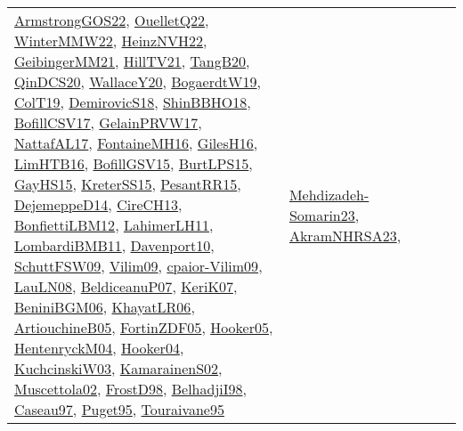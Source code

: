 {\begin{longtable}{llp{6cm}p{6cm}p{6cm}}
\href{papers/ArmstrongGOS22.pdf}{ArmstrongGOS22}\cite{ArmstrongGOS22}, \href{papers/OuelletQ22.pdf}{OuelletQ22}\cite{OuelletQ22}, \href{papers/WinterMMW22.pdf}{WinterMMW22}\cite{WinterMMW22}, \href{articles/HeinzNVH22.pdf}{HeinzNVH22}\cite{HeinzNVH22}, \href{papers/GeibingerMM21.pdf}{GeibingerMM21}\cite{GeibingerMM21}, \href{papers/HillTV21.pdf}{HillTV21}\cite{HillTV21}, \href{papers/TangB20.pdf}{TangB20}\cite{TangB20}, \href{articles/QinDCS20.pdf}{QinDCS20}\cite{QinDCS20}, \href{articles/WallaceY20.pdf}{WallaceY20}\cite{WallaceY20}, \href{papers/BogaerdtW19.pdf}{BogaerdtW19}\cite{BogaerdtW19}, \href{papers/ColT19.pdf}{ColT19}\cite{ColT19}, \href{papers/DemirovicS18.pdf}{DemirovicS18}\cite{DemirovicS18}, \href{articles/ShinBBHO18.pdf}{ShinBBHO18}\cite{ShinBBHO18}, \href{papers/BofillCSV17.pdf}{BofillCSV17}\cite{BofillCSV17}, \href{papers/GelainPRVW17.pdf}{GelainPRVW17}\cite{GelainPRVW17}, \href{articles/NattafAL17.pdf}{NattafAL17}\cite{NattafAL17}, \href{papers/FontaineMH16.pdf}{FontaineMH16}\cite{FontaineMH16}, \href{papers/GilesH16.pdf}{GilesH16}\cite{GilesH16}, \href{papers/LimHTB16.pdf}{LimHTB16}\cite{LimHTB16}, \href{papers/BofillGSV15.pdf}{BofillGSV15}\cite{BofillGSV15}, \href{papers/BurtLPS15.pdf}{BurtLPS15}\cite{BurtLPS15}, \href{papers/GayHS15.pdf}{GayHS15}\cite{GayHS15}, \href{papers/KreterSS15.pdf}{KreterSS15}\cite{KreterSS15}, \href{papers/PesantRR15.pdf}{PesantRR15}\cite{PesantRR15}, \href{papers/DejemeppeD14.pdf}{DejemeppeD14}\cite{DejemeppeD14}, \href{papers/CireCH13.pdf}{CireCH13}\cite{CireCH13}, \href{papers/BonfiettiLBM12.pdf}{BonfiettiLBM12}\cite{BonfiettiLBM12}, \href{papers/LahimerLH11.pdf}{LahimerLH11}\cite{LahimerLH11}, \href{papers/LombardiBMB11.pdf}{LombardiBMB11}\cite{LombardiBMB11}, \href{papers/Davenport10.pdf}{Davenport10}\cite{Davenport10}, \href{papers/SchuttFSW09.pdf}{SchuttFSW09}\cite{SchuttFSW09}, \href{papers/Vilim09.pdf}{Vilim09}\cite{Vilim09}, \href{papers/cpaior-Vilim09.pdf}{cpaior-Vilim09}\cite{cpaior-Vilim09}, \href{papers/LauLN08.pdf}{LauLN08}\cite{LauLN08}, \href{papers/BeldiceanuP07.pdf}{BeldiceanuP07}\cite{BeldiceanuP07}, \href{papers/KeriK07.pdf}{KeriK07}\cite{KeriK07}, \href{papers/BeniniBGM06.pdf}{BeniniBGM06}\cite{BeniniBGM06}, \href{articles/KhayatLR06.pdf}{KhayatLR06}\cite{KhayatLR06}, \href{papers/ArtiouchineB05.pdf}{ArtiouchineB05}\cite{ArtiouchineB05}, \href{papers/FortinZDF05.pdf}{FortinZDF05}\cite{FortinZDF05}, \href{articles/Hooker05.pdf}{Hooker05}\cite{Hooker05}, \href{papers/HentenryckM04.pdf}{HentenryckM04}\cite{HentenryckM04}, \href{papers/Hooker04.pdf}{Hooker04}\cite{Hooker04}, \href{articles/KuchcinskiW03.pdf}{KuchcinskiW03}\cite{KuchcinskiW03}, \href{papers/KamarainenS02.pdf}{KamarainenS02}\cite{KamarainenS02}, \href{papers/Muscettola02.pdf}{Muscettola02}\cite{Muscettola02}, \href{papers/FrostD98.pdf}{FrostD98}\cite{FrostD98}, \href{articles/BelhadjiI98.pdf}{BelhadjiI98}\cite{BelhadjiI98}, \href{papers/Caseau97.pdf}{Caseau97}\cite{Caseau97}, \href{papers/Puget95.pdf}{Puget95}\cite{Puget95}, \href{papers/Touraivane95.pdf}{Touraivane95}\cite{Touraivane95} & \href{papers/Mehdizadeh-Somarin23.pdf}{Mehdizadeh-Somarin23}\cite{Mehdizadeh-Somarin23}, \href{articles/AkramNHRSA23.pdf}{AkramNHRSA23}\cite{AkramNHRSA23}, 
\end{longtable}}
